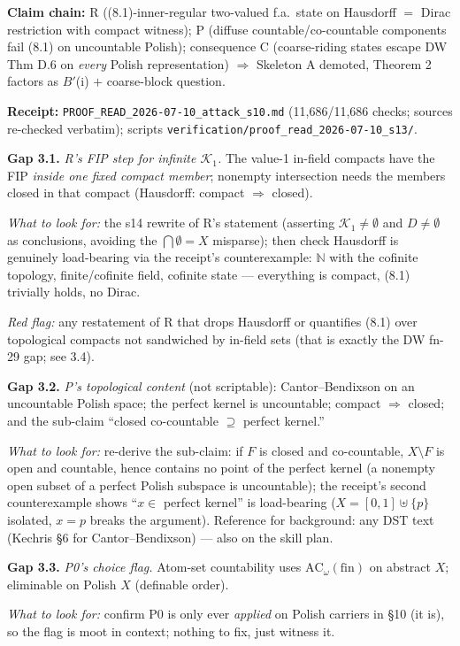\documentclass[11pt]{article}
\newcommand{\file}[1]{\texttt{\small #1}}
\newcommand{\gap}[1]{\medskip\noindent\textbf{Gap #1.}}
\newcommand{\lookfor}{\par\smallskip\noindent\emph{What to look for:} }
\newcommand{\redflag}{\par\smallskip\noindent\emph{Red flag:} }
\begin{document}
\noindent\textbf{Claim chain:} R ((8.1)-inner-regular two-valued f.a.\
state on Hausdorff $=$ Dirac restriction with compact witness); P
(diffuse countable/co-countable components fail (8.1) on uncountable
Polish); consequence C (coarse-riding states escape DW Thm D.6 on
\emph{every} Polish representation) $\Rightarrow$ Skeleton A demoted,
Theorem 2 factors as $B'$(i) $+$ coarse-block question.

\noindent\textbf{Receipt:} \file{PROOF\_READ\_2026-07-10\_attack\_s10.md}
(11{,}686/11{,}686 checks; sources re-checked verbatim);
scripts \file{verification/proof\_read\_2026-07-10\_s13/}.

\gap{3.1} \emph{R's FIP step for infinite $\mathcal K_1$.} The
value-1 in-field compacts have the FIP \emph{inside one fixed compact
member}; nonempty intersection needs the members closed in that
compact (Hausdorff: compact $\Rightarrow$ closed).
\lookfor the s14 rewrite of R's statement (asserting $\mathcal K_1
\neq \emptyset$ and $D \neq \emptyset$ as conclusions, avoiding the
$\bigcap \emptyset = X$ misparse); then check Hausdorff is genuinely
load-bearing via the receipt's counterexample: $\mathbb N$ with the
cofinite topology, finite/cofinite field, cofinite state ---
everything is compact, (8.1) trivially holds, no Dirac.
\redflag any restatement of R that drops Hausdorff or quantifies
(8.1) over topological compacts not sandwiched by in-field sets
(that is exactly the DW fn-29 gap; see 3.4).

\gap{3.2} \emph{P's topological content} (not scriptable):
Cantor--Bendixson on an uncountable Polish space; the perfect kernel
is uncountable; compact $\Rightarrow$ closed; and the sub-claim
``closed co-countable $\supseteq$ perfect kernel.''
\lookfor re-derive the sub-claim: if $F$ is closed and co-countable,
$X \setminus F$ is open and countable, hence contains no point of the
perfect kernel (a nonempty open subset of a perfect Polish subspace is
uncountable); the receipt's second counterexample shows ``$x \in$
perfect kernel'' is load-bearing ($X = [0,1] \uplus \{p\}$ isolated,
$x = p$ breaks the argument). Reference for background: any DST text
(Kechris \S6 for Cantor--Bendixson) --- also on the skill plan.

\gap{3.3} \emph{P0's choice flag.} Atom-set countability uses
$\mathrm{AC}_\omega(\mathrm{fin})$ on abstract $X$; eliminable on
Polish $X$ (definable order).
\lookfor confirm P0 is only ever \emph{applied} on Polish carriers in
\S10 (it is), so the flag is moot in context; nothing to fix, just
witness it.
\end{document}
